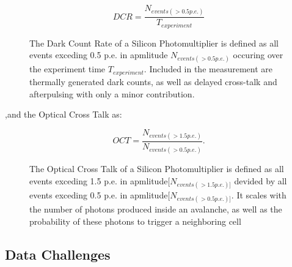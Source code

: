 \documentclass[12pt,article,type=msc,colorback,accentcolor=tud9c]{tudthesis}
\begin{document}
\begin{figure}[h]
\begin{equation}
DCR = \frac{N_{events(>0.5p.e.)}}{T_{experiment}}
\end{equation}
\label{DCR_eq}
\caption{The Dark Count Rate of a Silicon Photomultiplier is defined as all events exceding 0.5 p.e. in apmlitude $N_{events(>0.5p.e.)}$ occuring over the experiment time $T_{experiment}$. Included in the measurement are thermally generated dark counts, as well as delayed cross-talk and afterpulsing with only a minor contribution.}
\end{figure}
,and the Optical Cross Talk as:
\begin{figure}[h]
\begin{equation}
OCT = \frac{N_{events(>1.5p.e.)}}{N_{events(>0.5p.e.)}}.
\end{equation}
\label{OCT_eq}
\caption{The Optical Cross Talk of a Silicon Photomultiplier is defined as all events exceding 1.5 p.e. in apmlitude$[N_{events(>1.5p.e.)]}$ devided by all events exceding 0.5 p.e. in apmlitude$[N_{events(>0.5p.e.)]}$. It scales with the number of photons produced inside an avalanche, as well as the probability of these photons to trigger a neighboring cell}
\end{figure}

\newpage
\subsection{Data Challenges}
\end{document}
